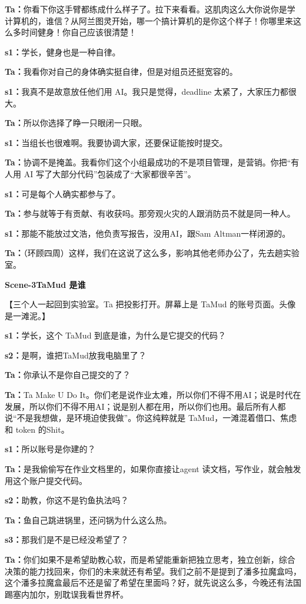 \documentclass[12pt]{article}
\newcommand{\scene}[2]{%
  \clearpage
  {\Large\bfseries #1\quad #2}\par
  \vspace{0.6em}
}
\newcommand{\dialogue}[2]{%
  \textbf{#1：}#2\par
}
\newcommand{\stage}[1]{%
  {\sffamily\color{gray}#1}\par
}
\begin{document}
\dialogue{Ta}{你看下你这手臂都练成什么样子了。拉下来看看。这肌肉这么大你说你是学计算机的，谁信？从阿兰图灵开始，哪一个搞计算机的是你这个样子！你哪里来这么多时间健身！你自己应该很清楚！}

\dialogue{s1}{学长，健身也是一种自律。}

\dialogue{Ta}{我看你对自己的身体确实挺自律，但是对组员还挺宽容的。}

\dialogue{s1}{我真不是故意放任他们用 AI。我只是觉得，deadline 太紧了，大家压力都很大。}

\dialogue{Ta}{所以你选择了睁一只眼闭一只眼。}

\dialogue{s1}{当组长也很难啊。我要协调大家，还要保证能按时提交。}

\dialogue{Ta}{协调不是掩盖。我看你们这个小组最成功的不是项目管理，是营销。你把“有人用 AI 写了大部分代码”包装成了“大家都很辛苦”。}

\dialogue{s1}{可是每个人确实都参与了。}

\dialogue{Ta}{参与就等于有贡献、有收获吗。那旁观火灾的人跟消防员不就是同一种人。}

\dialogue{s1}{那能不能放过文浩，他负责写报告，没用AI，跟Sam Altman一样闭源的。}

\dialogue{Ta}{（环顾四周）这样，我们在这说了这么多，影响其他老师办公了，先去趟实验室。}

\scene{Scene-3}{TaMud 是谁}

\stage{【三个人一起回到实验室。Ta 把投影打开。屏幕上是 TaMud 的账号页面。头像是一滩泥。】}

\dialogue{s1}{学长，这个 TaMud 到底是谁，为什么是它提交的代码？}

\dialogue{s2}{是啊，谁把TaMud放我电脑里了？}

\dialogue{Ta}{你承认不是你自己提交的了？}

\dialogue{Ta}{Ta Make U Do It。你们老是说作业太难，所以你们不得不用AI；说是时代在发展，所以你们不得不用AI；说是别人都在用，所以你们也用。最后所有人都说“不是我想做，是环境迫使我做”。你这纯粹就是 TaMud，一滩混着借口、焦虑和 token 的Shit。}

\dialogue{s1}{所以账号是你建的？}

\dialogue{Ta}{是我偷偷写在作业文档里的，如果你直接让agent 读文档，写作业，就会触发用这个账户提交代码。}

\dialogue{s2}{助教，你这不是钓鱼执法吗？}

\dialogue{Ta}{鱼自己跳进锅里，还问锅为什么这么热。}

\dialogue{s3}{那我们是不是已经没希望了？}

\dialogue{Ta}{你们如果不是希望助教心软，而是希望能重新把独立思考，独立创新，综合决策的能力找回来，你们的未来就还有希望。我们之前不是提到了潘多拉魔盒吗，这个潘多拉魔盒最后不还是留了希望在里面吗？好，就先说这么多，今晚还有法国踢塞内加尔，别耽误我看世界杯。}
\end{document}
